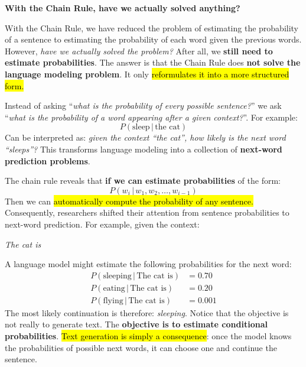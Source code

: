 \begin{flushleft}
    \textcolor{Green3}{ \textbf{With the Chain Rule, have we actually solved anything?}}
\end{flushleft}
With the Chain Rule, we have reduced the problem of estimating the probability of a sentence to estimating the probability of each word given the previous words. However, \emph{have we actually solved the problem?} After all, we \textbf{still need to estimate probabilities}. The answer is that the Chain Rule does \textbf{not solve the language modeling problem}. It only \hl{reformulates it into a more structured form.}

\highspace
Instead of asking ``\emph{what is the probability of every possible sentence?}'' we ask ``\emph{what is the probability of a word appearing after a given context?}''. For example:
\begin{equation*}
    P\left(\text{sleep} \, | \, \text{the cat}\right)
\end{equation*}
Can be interpreted as: \emph{given the context ``the cat'', how likely is the next word ``sleeps''?} This transforms language modeling into a collection of \textbf{next-word prediction problems}.

\highspace
The chain rule reveals that \textbf{if we can estimate probabilities} of the form:
\begin{equation*}
    P\left(w_i \, | \, w_1, w_2, \dots, w_{i-1}\right)
\end{equation*}
Then we can \hl{automatically compute the probability of any sentence.} Consequently, researchers shifted their attention from sentence probabilities to next-word prediction. For example, given the context:
\begin{center}
    \emph{The cat is}
\end{center}
A language model might estimate the following probabilities for the next word:
\begin{align*}
    P\left(\text{sleeping} \, | \, \text{The cat is}\right) &= 0.70 \\
    P\left(\text{eating} \, | \, \text{The cat is}\right) &= 0.20 \\
    P\left(\text{flying} \, | \, \text{The cat is}\right) &= 0.001
\end{align*}
The most likely continuation is therefore: \emph{sleeping}. Notice that the objective is not really to generate text. The \textbf{objective is to estimate conditional probabilities}. \hl{Text generation is simply a consequence}: once the model knows the probabilities of possible next words, it can choose one and continue the sentence.

